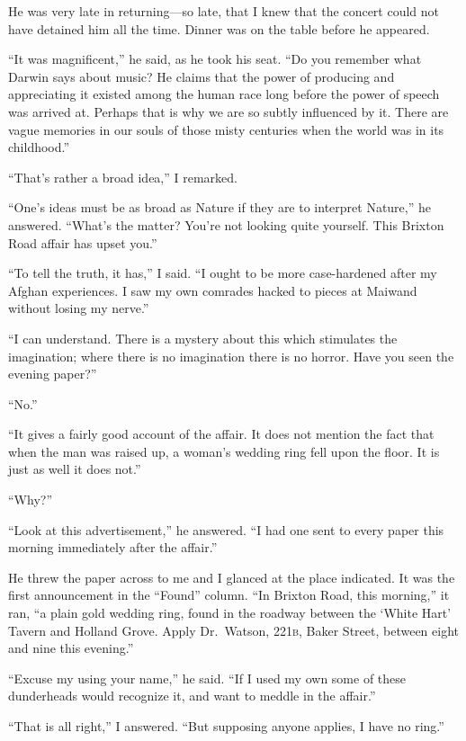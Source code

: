 \documentclass[12pt,english,oneside]{book}
\newcommand{\noun}[1]{\textsc{#1}}
\newcommand{\mdsh}[1]{\mbox{#1}\linebreak[1]}
\begin{document}
He was very late in returning\mdsh{---}so late, that I knew that
the concert could not have detained him all the time. Dinner was on
the table before he appeared.

{}``It was magnificent,'' he said, as he took his seat. {}``Do
you remember what Darwin says about music? He claims that the power
of producing and appreciating it existed among the human race long
before the power of speech was arrived at. Perhaps that is why we
are so subtly influenced by it. There are vague memories in our souls
of those misty centuries when the world was in its childhood.''

{}``That's rather a broad idea,'' I remarked.

{}``One's ideas must be as broad as Nature if they are to interpret
Nature,'' he answered. {}``What's the matter? You're not looking
quite yourself. This Brixton Road affair has upset you.''

{}``To tell the truth, it has,'' I said. {}``I ought to be more
case-hardened after my Afghan experiences. I saw my own comrades hacked
to pieces at Maiwand without losing my nerve.''

{}``I can understand. There is a mystery about this which stimulates
the imagination; where there is no imagination there is no horror.
Have you seen the evening paper?''

{}``No.''

{}``It gives a fairly good account of the affair. It does not mention
the fact that when the man was raised up, a woman's wedding ring fell
upon the floor. It is just as well it does not.''

{}``Why?''

{}``Look at this advertisement,'' he answered. {}``I had one sent
to every paper this morning immediately after the affair.''

He threw the paper across to me and I glanced at the place indicated.
It was the first announcement in the {}``Found'' column. {}``In
Brixton Road, this morning,'' it ran, {}``a plain gold wedding ring,
found in the roadway between the `White Hart' Tavern and Holland Grove.
Apply Dr.\ Watson, \noun{221b}, Baker Street, between eight and
nine this evening.''

{}``Excuse my using your name,'' he said. {}``If I used my own
some of these dunderheads would recognize it, and want to meddle in
the affair.''

{}``That is all right,'' I answered. {}``But supposing anyone applies,
I have no ring.''
\end{document}
